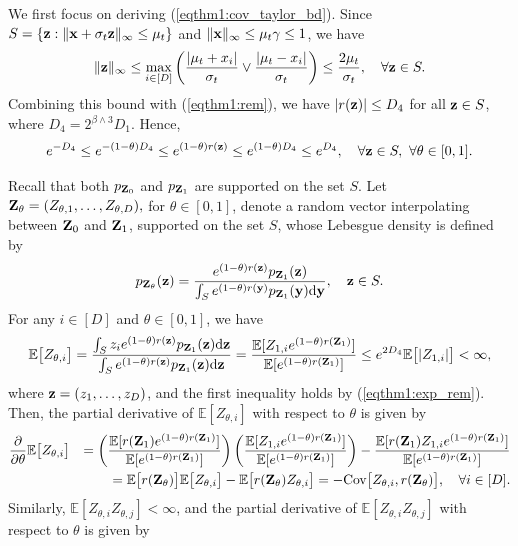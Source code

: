 \documentclass[11pt,a4paper,final]{article}
\numberwithin{equation}{section}
\theoremstyle{remark}
\newcommand{\bx}{{\bf x}}
\newcommand{\by}{{\bf y}}
\newcommand{\bz}{{\bf z}}
\newcommand{\bZ}{{\bf Z}}
\newcommand{\bbE}{{\mathbb E}}
\newcommand{\be}{\begin{equation}}
\newcommand{\ee}{\end{equation}}
\newcommand{\bean}{\setlength\arraycolsep{1pt}\begin{eqnarray*}}
\newcommand{\eean}{\end{eqnarray*}}
\def\d{{\rm d}}
\begin{document}
We first focus on deriving (\ref{eqthm1:cov_taylor_bd}).
Since $ S = \{ \bz : \|\bx + \sigma_t \bz \|_{\infty} \leq \mu_t \}$ and $\| \bx \|_{\infty} \leq \mu_{t} \gamma \leq 1$, we have
\bean
\| \bz \|_{\infty} \leq \max_{i \in [D]} \left( \frac{\vert \mu_t + x_i \vert }{\sigma_t} \vee \frac{\vert \mu_t - x_i \vert }{\sigma_t} \right) \leq \frac{2 \mu_t }{\sigma_{t}},
\quad \forall \bz \in S.
\eean
Combining this bound with (\ref{eqthm1:rem}), we have $\vert r(\bz) \vert \leq D_{4}$ for all $\bz \in S$, where $D_{4} = 2^{\beta \wedge 3} D_{1}$.
Hence,
\be
e^{-D_{4}}
\leq e^{- (1-\theta) D_{4}}
\leq e^{ ( 1 - \theta ) r(\bz) }
\leq e^{ ( 1 - \theta ) D_{4}}
\leq e^{D_{4}}, \quad \forall \bz \in S, \ \forall \theta \in [0,1].
\label{eqthm1:exp_rem}
\ee

Recall that both $p_{\bZ_0}$ and $p_{\bZ_1}$ are supported on the set $S$.
Let  $\bZ_{\theta} = (Z_{\theta,1},\ldots,Z_{\theta,D}),$ for $\theta \in [0,1]$, denote a random vector interpolating between $\bZ_{0}$ and $\bZ_{1}$, supported on the set $S$, whose Lebesgue density is defined by
\bean
p_{\bZ_{\theta}}(\bz)
= \frac{e^{ ( 1- \theta) r(\bz)} p_{ \bZ_{1} }(\bz) }{\int_{S}  e^{ ( 1- \theta) r(\by)} p_{\bZ_{1}}(\by) \d \by },
\quad \bz \in S.
\eean
For any $i \in [D]$ and $\theta \in [0,1]$, we have
\bean
\bbE \big[ Z_{\theta,i} \big]
 = \frac{\int_{S} z_i e^{ ( 1- \theta) r(\bz)} p_{ \bZ_{1} }(\bz) \d \bz }{\int_{S}  e^{ ( 1- \theta) r(\bz)} p_{\bZ_{1}}(\bz) \d \bz  }
= \frac{ \bbE [ Z_{1,i} e^{ ( 1- \theta) r(\bZ_1) } ] }{ \bbE[ e^{ ( 1- \theta) r( \bZ_{1} ) } ]}
\leq e^{2D_{4}} \bbE \big[ \vert Z_{1,i} \vert \big] < \infty,
\eean
where $\bz = (z_1, \ldots, z_{D})$, and the first inequality holds by (\ref{eqthm1:exp_rem}).
Then, the partial derivative of $\bbE[Z_{\theta,i}]$ with respect to $\theta$ is given by
\bean
\frac{\partial}{\partial {\theta}} \bbE \big[ Z_{\theta,i} \big]
&& = 
\left( \frac{ \bbE[ r(\bZ_{1}) e^{ ( 1- \theta) r(\bZ_1) }  ]  }{\bbE[ e^{ ( 1- \theta) r(\bZ_1) }  ]} \right) \left( \frac{ \bbE[ Z_{1,i} e^{ ( 1- \theta) r(\bZ_1) }  ]  }{\bbE[ e^{ ( 1- \theta) r(\bZ_1) }  ]} \right)
- \frac{ \bbE[ r(\bZ_{1}) Z_{1,i} e^{ ( 1- \theta) r(\bZ_1) }  ]  }{\bbE[ e^{ ( 1- \theta) r(\bZ_1) }  ]}
\\
&& = \bbE \big[ r(\bZ_{\theta}) \big] \bbE \big[ Z_{\theta,i} \big] - \bbE \big[ r(\bZ_{\theta})  Z_{\theta,i} \big]
=
- \text{Cov} \big[Z_{\theta,i}, r(\bZ_{\theta}) \big],
\quad \forall i \in [D].
\eean
Similarly, $\bbE[ Z_{\theta,i} Z_{\theta,j}] < \infty$, and the partial derivative of $\bbE[ Z_{\theta,i} Z_{\theta,j}]$ with respect to $\theta$ is given by
\end{document}
